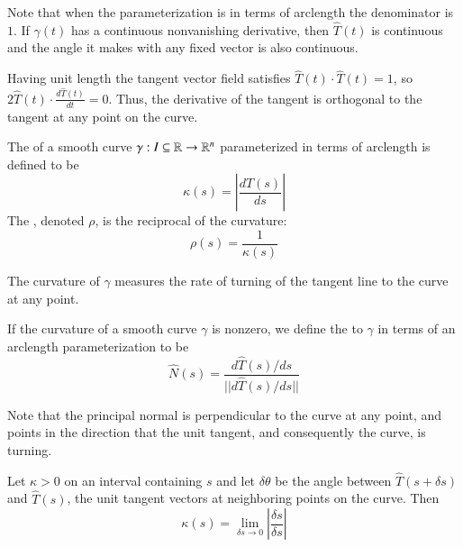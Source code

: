 \begin{appendices}
    Note that when the parameterization is in terms of arclength the denominator is $1$. If $\gamma(t)$ has a continuous nonvanishing derivative, then $\hat{T}(t)$ is continuous and the angle it makes with any fixed vector is also continuous.

    Having unit length the tangent vector field satisfies $\hat{T}(t)\cdot\hat{T}(t) = 1$, so $2\hat{T}(t)\cdot \frac{d\hat{T}(t)}{dt} = 0$. Thus, the derivative of the tangent is orthogonal to the tangent at any point on the curve.

    \begin{defn}
        The  of a smooth curve $\gamma:I\subseteq \mathbb R\rightarrow \mathbb R^n$ parameterized in terms of arclength is defined to be \begin{equation*}
            \kappa(s) = \left|\frac{d\hat{T}(s)}{ds}\right|
        \end{equation*}
        The , denoted $\rho$, is the reciprocal of the curvature: \begin{equation*}
            \rho(s) = \frac{1}{\kappa(s)}
        \end{equation*}
    \end{defn}

    The curvature of $\gamma$ measures the rate of turning of the tangent line to the curve at any point.

    \begin{defn}
        If the curvature of a smooth curve $\gamma$ is nonzero, we define the  to $\gamma$ in terms of an arclength parameterization to be \begin{equation*}
            \hat{N}(s) = \frac{d\hat{T}(s)/ds}{||d\hat{T}(s)/ds||}
        \end{equation*}
    \end{defn}

    Note that the principal normal is perpendicular to the curve at any point, and points in the direction that the unit tangent, and consequently the curve, is turning.

    \begin{thm}
        Let $\kappa > 0$ on an interval containing $s$ and let $\delta \theta$ be the angle between $\hat{T}(s+\delta s)$ and $\hat{T}(s)$, the unit tangent vectors at neighboring points on the curve. Then \begin{equation*}
            \kappa(s) = \lim\limits_{\delta s\rightarrow 0} \left|\frac{\delta s}{\delta s}\right|
        \end{equation*}
    \end{thm}


\end{appendices}
